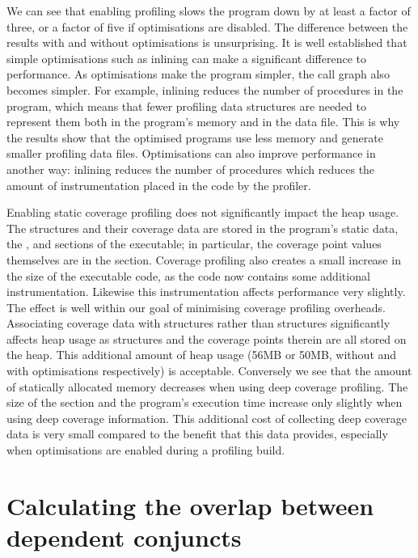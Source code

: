 We can see that enabling profiling slows the program down by at least a
factor of three,
or a factor of five if optimisations are disabled.
The difference between the results with and without optimisations is
unsurprising.
It is well established that simple optimisations such as inlining can make a
significant difference to performance.
As optimisations make the program simpler, the call graph also becomes
simpler.
For example, inlining reduces the number of procedures in the program,
which means that fewer profiling data structures are needed to represent
them both in the program's memory and in the data file.
This is why the results show that the optimised programs use less memory
and generate smaller profiling data files.
Optimisations can also improve performance in another way:
inlining reduces the number of procedures which reduces the amount of
instrumentation placed in the code by the profiler.

Enabling static coverage profiling does not significantly impact the heap
usage.
The \PS structures and their coverage data are stored in the program's
static data,
the ,  and  sections of the executable;
in particular, the coverage point values themselves are in the 
section.
Coverage profiling also creates a small increase in the size of the
executable code, as the code now contains some additional instrumentation.
Likewise this instrumentation affects performance very slightly.
The effect is well within our goal of minimising coverage profiling
overheads.
Associating coverage data with \PD structures rather than \PS structures
significantly affects heap usage as \PD structures and the coverage points
therein are all stored on the heap.
This additional amount of heap usage (56MB or 50MB,
without and with optimisations respectively)
is acceptable.
Conversely we see that the amount of statically allocated memory decreases
when using deep coverage profiling.
The size of the  section and the program's execution time
increase only slightly when using deep coverage information.
This additional cost of collecting deep coverage data is very small compared
to the benefit that this data provides,
especially when optimisations are enabled during a profiling build.


\section{Calculating the overlap between dependent conjuncts}
\label{sec:overlap_overlap_alg}


